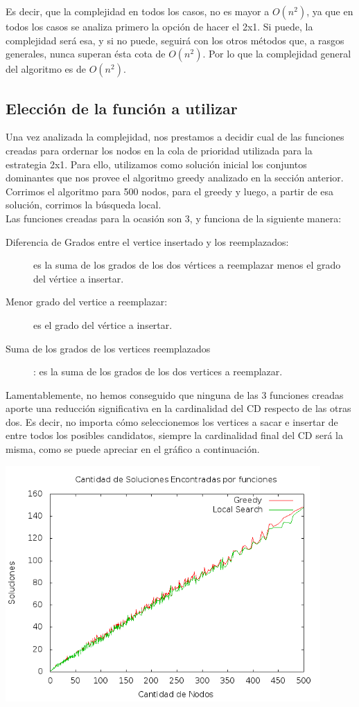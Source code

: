  Es decir, que la complejidad en todos los casos, no es mayor a $O(n^2)$, ya que en todos los casos se analiza primero la opción de hacer el 2x1. Si puede, la complejidad será esa, y si no puede, seguirá con los otros métodos que, a rasgos generales, nunca superan ésta cota de $O(n^2)$. Por lo que la complejidad general del algoritmo es de \textbf{$O(n^2)$}.
 
 \subsection{Elección de la función a utilizar}
 Una vez analizada la complejidad, nos prestamos a decidir cual de las funciones creadas para ordernar los nodos en la cola de prioridad utilizada para la estrategia 2x1. Para ello, utilizamos como solución inicial los conjuntos dominantes que nos provee el algoritmo greedy analizado en la sección anterior. Corrimos el algoritmo para 500 nodos, para el greedy y luego, a partir de esa solución, corrimos la búsqueda local. \\
Las funciones creadas para la ocasión son 3, y funciona de la siguiente manera: 
\begin{description}
\item[Diferencia de Grados entre el vertice insertado y los reemplazados:] es la suma de los grados de los dos vértices a reemplazar menos el grado del vértice a insertar.
\item[Menor grado del vertice a reemplazar:] es el grado del vértice a insertar.
\item[Suma de los grados de los vertices reemplazados]: es la suma de los grados de los dos vertices a reemplazar.
\end{description}

Lamentablemente, no hemos conseguido que ninguna de las 3 funciones creadas aporte una reducción significativa en la cardinalidad del CD respecto de las otras dos. Es decir, no importa cómo seleccionemos los vertices a sacar e insertar de entre todos los posibles candidatos, siempre la cardinalidad final del CD será la misma, como se puede apreciar en el gráfico a continuación. \\

\begin{center}
\includegraphics[width=12cm]{./graficos/comparacionSoluciones.png}
\end{center}

